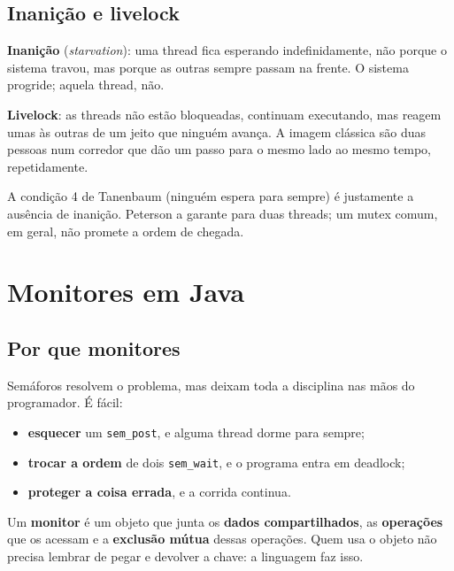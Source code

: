 \documentclass[11pt,a4paper]{article}
\newcommand{\cmd}[1]{\texttt{#1}}
\begin{document}
\subsection{Inanição e livelock}

\begin{definicao}
\textbf{Inanição} (\emph{starvation}): uma thread fica esperando indefinidamente, não porque o sistema travou, mas porque as outras sempre passam na frente. O sistema progride; aquela thread, não.

\textbf{Livelock}: as threads não estão bloqueadas, continuam executando, mas reagem umas às outras de um jeito que ninguém avança. A imagem clássica são duas pessoas num corredor que dão um passo para o mesmo lado ao mesmo tempo, repetidamente.
\end{definicao}

A condição 4 de Tanenbaum (ninguém espera para sempre) é justamente a ausência de inanição. Peterson a garante para duas threads; um mutex comum, em geral, não promete a ordem de chegada.

\section{Monitores em Java}

\subsection{Por que monitores}

Semáforos resolvem o problema, mas deixam toda a disciplina nas mãos do programador. É fácil:

\begin{itemize}
    \item \textbf{esquecer} um \cmd{sem\_post}, e alguma thread dorme para sempre;
    \item \textbf{trocar a ordem} de dois \cmd{sem\_wait}, e o programa entra em deadlock;
    \item \textbf{proteger a coisa errada}, e a corrida continua.
\end{itemize}

\begin{definicao}[Monitor]
Um \textbf{monitor} é um objeto que junta os \textbf{dados compartilhados}, as \textbf{operações} que os acessam e a \textbf{exclusão mútua} dessas operações. Quem usa o objeto não precisa lembrar de pegar e devolver a chave: a linguagem faz isso.
\end{definicao}
\end{document}
